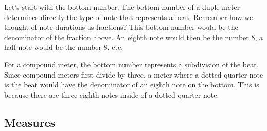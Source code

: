 \documentclass[../OpenAppliedMusicTheory.tex]{subfiles}
\begin{document}
        Let's start with the bottom number. The bottom number of a duple meter determines directly the type of note that represents a beat. Remember how we thought of note durations as fractions? This bottom number would be the denominator of the fraction above. An eighth note would then be the number 8, a half note would be the number 8, etc. 

        For a compound meter, the bottom number represents a  subdivision of the beat. Since compound meters first divide by three, %
        a meter where a dotted quarter note is the beat would have the denominator of an eighth note on the bottom. This is because there are three eighth notes inside of a dotted quarter note.

        \subsection{Measures}
\end{document}
